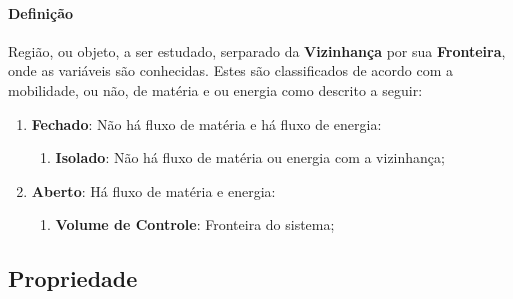 \documentclass{article}
\begin{document}
            \paragraph{Definição}Região, ou objeto, a ser estudado, serparado da \textbf{Vizinhança} por sua \textbf{Fronteira}, onde as variáveis são conhecidas. Estes são classificados de acordo com a mobilidade, ou não, de matéria e ou energia como descrito a seguir:
                \begin{enumerate}[noitemsep]
                    \item \textbf{Fechado}: Não há fluxo de matéria e há fluxo de energia:
                        \begin{enumerate}[noitemsep]
                            \item \textbf{Isolado}: Não há fluxo de matéria ou energia com a vizinhança;
                        \end{enumerate}
                    \item \textbf{Aberto}: Há fluxo de matéria e energia:
                        \begin{enumerate}[noitemsep]
                            \item \textbf{Volume de Controle}: Fronteira do sistema;
                        \end{enumerate}
                \end{enumerate}

        \subsection{Propriedade}
\end{document}
